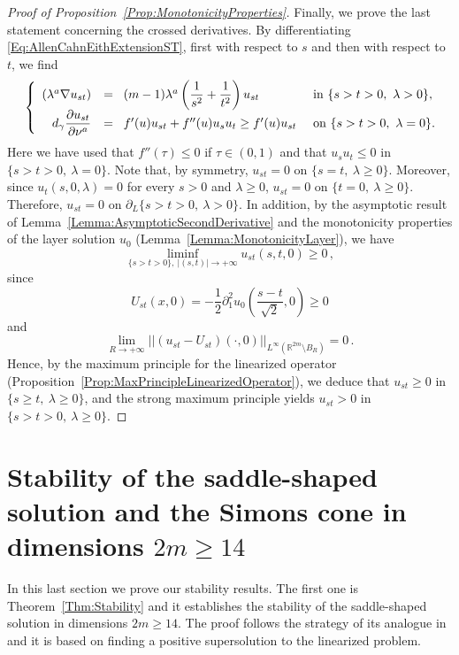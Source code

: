 \documentclass[twoside,leqno,symbols-for-thanks, draft]{rmi}
\numberwithin{equation}{section}
\theoremstyle{definition}
\newcommand{\con}[1]{\mathbb{#1}}
\newcommand{\R}{\con{R}} %
\newcommand{\norm}[1]{\left | \left |{#1} \right | \right |}
\newcommand{\s}{\gamma}
\newcommand{\bpar}[1]{\left ( {#1}\right )}
\newcommand\beqc[1]{\left\{\begin{array}{#1}}
\newcommand\eeqc{\end{array} \right.}
\def\PDEsystem{rcll}
\let\div\relax
\DeclareMathOperator{\div}{div}
\begin{document}
\begin{proof}[Proof of Proposition~\ref{Prop:MonotonicityProperties}]
	Finally, we prove the last statement concerning the crossed derivatives. By differentiating \eqref{Eq:AllenCahnEithExtensionST}, first with respect to $s$ and then with respect to $t$, we find
	$$
	\ \ 
	\beqc{\PDEsystem}
	\div (\lambda^a \nabla u_{st}) & = & \!(m-1)\lambda^a \bpar{\dfrac{1}{s^2} + \dfrac{1}{t^2} } u_{st} & \text{ in } \{ s > t > 0 ,\ \lambda > 0\}, \\
	d_\s \dfrac{\partial u_{st}}{\partial \nu^a}& = & \!f'(u)u_{st} + f''(u)u_s u_t \geq  f'(u)u_{st}& \text{ on }  \{ s > t > 0 , \ \lambda = 0\}.
	\eeqc
	$$
	Here we have used that $f''(\tau) \leq 0$ if $\tau \in (0,1)$ and that $u_s u_t \leq 0$ in  $\{ s > t > 0 , \ \lambda = 0\}$. Note that, by symmetry, $u_{st}= 0$ on $\{s=t, \ \lambda \geq 0 \}$. Moreover, since $u_t(s,0,\lambda) = 0$ for every $s > 0$ and $\lambda \geq 0$, $u_{st}= 0$ on $\{t=0, \ \lambda \geq 0 \}$. Therefore, $u_{st}= 0$ on $\partial_L \{ s > t > 0 ,\ \lambda > 0\}$. In addition, by the asymptotic result of Lemma~\ref{Lemma:AsymptoticSecondDerivative} and the monotonicity properties of the layer solution $u_0$ (Lemma~\ref{Lemma:MonotonicityLayer}), we have
	$$
	\liminf_{\{s> t>0\} ,\ |(s,t)|\to +\infty}  u_{st}(s,t,0) \geq 0\,,
	$$
	since
	$$
	U_{st} (x,0) = -\dfrac{1}{2} \partial_1^2 u_0\bpar{\dfrac{s-t}{\sqrt{2}}, 0} \geq 0 $$
	and
	$$
	\lim_{R\to +\infty} \norm{(u_{st} - U_{st})(\cdot,0) }_{L^\infty(\R^{2m}\setminus B_{R})} = 0\,.
	$$
	Hence, by the maximum principle for the linearized operator (Proposition~\ref{Prop:MaxPrincipleLinearizedOperator}), we deduce that $u_{st} \geq 0$ in $\{ s \geq t,\ \lambda \geq 0\}$, and the strong maximum principle yields $u_{st} > 0$ in $\{ s > t > 0,\ \lambda \geq 0\}$.
\end{proof}


\section{Stability of the saddle-shaped solution and the Simons cone in dimensions $2m\geq 14$}
\label{Sec:Stability}

In this last section we prove our stability results. The first one is Theorem~\ref{Thm:Stability} and it establishes the stability of the saddle-shaped solution in dimensions $2m\geq 14$. The proof follows the strategy of its analogue in \cite{Cabre-Saddle} and it is based on finding a positive supersolution to the linearized problem. 
\end{document}
